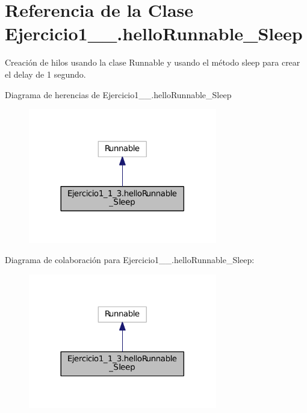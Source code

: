 \hypertarget{class_ejercicio1__1__3_1_1hello_runnable___sleep}{}\section{Referencia de la Clase Ejercicio1\+\_\+\_.\+hello\+Runnable\+\_\+\+Sleep}
\label{class_ejercicio1__1__3_1_1hello_runnable___sleep}


Creación de hilos usando la clase Runnable y usando el método sleep para crear el delay de 1 segundo.  




Diagrama de herencias de Ejercicio1\+\_\+\_.\+hello\+Runnable\+\_\+\+Sleep
\nopagebreak
\begin{figure}[H]
\begin{center}
\leavevmode
\includegraphics[width=233pt]{class_ejercicio1__1__3_1_1hello_runnable___sleep__inherit__graph}
\end{center}
\end{figure}


Diagrama de colaboración para Ejercicio1\+\_\+\_.\+hello\+Runnable\+\_\+\+Sleep\+:
\nopagebreak
\begin{figure}[H]
\begin{center}
\leavevmode
\includegraphics[width=233pt]{class_ejercicio1__1__3_1_1hello_runnable___sleep__coll__graph}
\end{center}
\end{figure}
